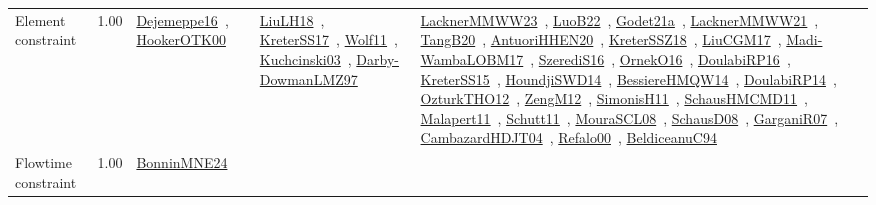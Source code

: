 {\begin{longtable}{p{3cm}r>{\raggedright\arraybackslash}p{6cm}>{\raggedright\arraybackslash}p{6cm}>{\raggedright\arraybackslash}p{8cm}}
\index{Element constraint}\index{Constraints!Element constraint}Element constraint &  1.00 & \href{../works/Dejemeppe16.pdf}{Dejemeppe16}~\cite{Dejemeppe16}, \href{../works/HookerOTK00.pdf}{HookerOTK00}~\cite{HookerOTK00} & \href{../works/LiuLH18.pdf}{LiuLH18}~\cite{LiuLH18}, \href{../works/KreterSS17.pdf}{KreterSS17}~\cite{KreterSS17}, \href{../works/Wolf11.pdf}{Wolf11}~\cite{Wolf11}, \href{../works/Kuchcinski03.pdf}{Kuchcinski03}~\cite{Kuchcinski03}, \href{../works/Darby-DowmanLMZ97.pdf}{Darby-DowmanLMZ97}~\cite{Darby-DowmanLMZ97} & \href{../works/LacknerMMWW23.pdf}{LacknerMMWW23}~\cite{LacknerMMWW23}, \href{../works/LuoB22.pdf}{LuoB22}~\cite{LuoB22}, \href{../works/Godet21a.pdf}{Godet21a}~\cite{Godet21a}, \href{../works/LacknerMMWW21.pdf}{LacknerMMWW21}~\cite{LacknerMMWW21}, \href{../works/TangB20.pdf}{TangB20}~\cite{TangB20}, \href{../works/AntuoriHHEN20.pdf}{AntuoriHHEN20}~\cite{AntuoriHHEN20}, \href{../works/KreterSSZ18.pdf}{KreterSSZ18}~\cite{KreterSSZ18}, \href{../works/LiuCGM17.pdf}{LiuCGM17}~\cite{LiuCGM17}, \href{../works/Madi-WambaLOBM17.pdf}{Madi-WambaLOBM17}~\cite{Madi-WambaLOBM17}, \href{../works/SzerediS16.pdf}{SzerediS16}~\cite{SzerediS16}, \href{../works/OrnekO16.pdf}{OrnekO16}~\cite{OrnekO16}, \href{../works/DoulabiRP16.pdf}{DoulabiRP16}~\cite{DoulabiRP16}, \href{../works/KreterSS15.pdf}{KreterSS15}~\cite{KreterSS15}, \href{../works/HoundjiSWD14.pdf}{HoundjiSWD14}~\cite{HoundjiSWD14}, \href{../works/BessiereHMQW14.pdf}{BessiereHMQW14}~\cite{BessiereHMQW14}, \href{../works/DoulabiRP14.pdf}{DoulabiRP14}~\cite{DoulabiRP14}, \href{../works/OzturkTHO12.pdf}{OzturkTHO12}~\cite{OzturkTHO12}, \href{../works/ZengM12.pdf}{ZengM12}~\cite{ZengM12}, \href{../works/SimonisH11.pdf}{SimonisH11}~\cite{SimonisH11}, \href{../works/SchausHMCMD11.pdf}{SchausHMCMD11}~\cite{SchausHMCMD11}, \href{../works/Malapert11.pdf}{Malapert11}~\cite{Malapert11}, \href{../works/Schutt11.pdf}{Schutt11}~\cite{Schutt11}, \href{../works/MouraSCL08.pdf}{MouraSCL08}~\cite{MouraSCL08}, \href{../works/SchausD08.pdf}{SchausD08}~\cite{SchausD08}, \href{../works/GarganiR07.pdf}{GarganiR07}~\cite{GarganiR07}, \href{../works/CambazardHDJT04.pdf}{CambazardHDJT04}~\cite{CambazardHDJT04}, \href{../works/Refalo00.pdf}{Refalo00}~\cite{Refalo00}, \href{../works/BeldiceanuC94.pdf}{BeldiceanuC94}~\cite{BeldiceanuC94}\\
\index{Flowtime constraint}\index{Constraints!Flowtime constraint}Flowtime constraint &  1.00 & \href{../works/BonninMNE24.pdf}{BonninMNE24}~\cite{BonninMNE24} &  & \\

\end{longtable}}
